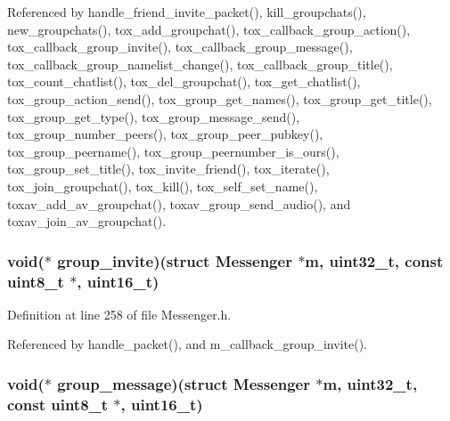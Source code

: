 Referenced by handle\+\_\+friend\+\_\+invite\+\_\+packet(), kill\+\_\+groupchats(), new\+\_\+groupchats(), tox\+\_\+add\+\_\+groupchat(), tox\+\_\+callback\+\_\+group\+\_\+action(), tox\+\_\+callback\+\_\+group\+\_\+invite(), tox\+\_\+callback\+\_\+group\+\_\+message(), tox\+\_\+callback\+\_\+group\+\_\+namelist\+\_\+change(), tox\+\_\+callback\+\_\+group\+\_\+title(), tox\+\_\+count\+\_\+chatlist(), tox\+\_\+del\+\_\+groupchat(), tox\+\_\+get\+\_\+chatlist(), tox\+\_\+group\+\_\+action\+\_\+send(), tox\+\_\+group\+\_\+get\+\_\+names(), tox\+\_\+group\+\_\+get\+\_\+title(), tox\+\_\+group\+\_\+get\+\_\+type(), tox\+\_\+group\+\_\+message\+\_\+send(), tox\+\_\+group\+\_\+number\+\_\+peers(), tox\+\_\+group\+\_\+peer\+\_\+pubkey(), tox\+\_\+group\+\_\+peername(), tox\+\_\+group\+\_\+peernumber\+\_\+is\+\_\+ours(), tox\+\_\+group\+\_\+set\+\_\+title(), tox\+\_\+invite\+\_\+friend(), tox\+\_\+iterate(), tox\+\_\+join\+\_\+groupchat(), tox\+\_\+kill(), tox\+\_\+self\+\_\+set\+\_\+name(), toxav\+\_\+add\+\_\+av\+\_\+groupchat(), toxav\+\_\+group\+\_\+send\+\_\+audio(), and toxav\+\_\+join\+\_\+av\+\_\+groupchat().

\hypertarget{struct_messenger_a60eaca4be38363ad7bc9d454fee814f4}{
\subsubsection[{group\+\_\+invite}]{\setlength{\rightskip}{0pt plus 5cm}void($\ast$ group\+\_\+invite)(struct {\bf Messenger} $\ast${\bf m}, uint32\+\_\+t, const uint8\+\_\+t $\ast$, uint16\+\_\+t)}}\label{struct_messenger_a60eaca4be38363ad7bc9d454fee814f4}


Definition at line 258 of file Messenger.\+h.



Referenced by handle\+\_\+packet(), and m\+\_\+callback\+\_\+group\+\_\+invite().

\hypertarget{struct_messenger_a41600d8061cac9e1ac8cef62bc690149}{
\subsubsection[{group\+\_\+message}]{\setlength{\rightskip}{0pt plus 5cm}void($\ast$ group\+\_\+message)(struct {\bf Messenger} $\ast${\bf m}, uint32\+\_\+t, const uint8\+\_\+t $\ast$, uint16\+\_\+t)}}\label{struct_messenger_a41600d8061cac9e1ac8cef62bc690149}


